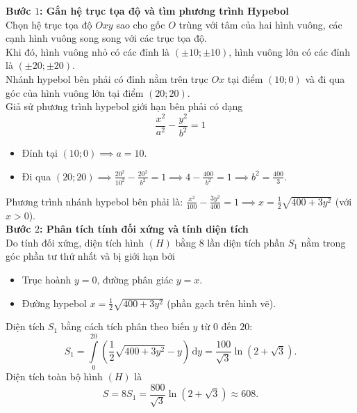 \begin{ex}
{\begin{center}
		\end{center}
		\textbf{Bước $1$: Gắn hệ trục tọa độ và tìm phương trình Hypebol}\\
		Chọn hệ trục tọa độ $Oxy$ sao cho gốc $O$ trùng với tâm của hai hình vuông, các cạnh hình vuông song song với các trục tọa độ.\\
		Khi đó, hình vuông nhỏ có các đỉnh là $(\pm 10; \pm 10)$, hình vuông lớn có các đỉnh là $(\pm 20; \pm 20)$.\\
		Nhánh hypebol bên phải có đỉnh nằm trên trục $Ox$ tại điểm $(10; 0)$ và đi qua góc của hình vuông lớn tại điểm $(20; 20)$.\\
		Giả sử phương trình hypebol giới hạn bên phải có dạng
		\[ \frac{x^2}{a^2} - \frac{y^2}{b^2} = 1 \]
		\begin{itemize}
			\item Đỉnh tại $(10; 0) \implies a = 10$.
			\item Đi qua $(20; 20) \implies \displaystyle \frac{20^2}{10^2} - \frac{20^2}{b^2} = 1 \implies 4 - \frac{400}{b^2} = 1 \implies b^2 = \frac{400}{3}$.
		\end{itemize}
		Phương trình nhánh hypebol bên phải là: $\displaystyle \frac{x^2}{100} - \frac{3y^2}{400} = 1 \implies x = \frac{1}{2}\sqrt{400 + 3y^2}$ (với $x > 0$).\\
		\textbf{Bước $2$: Phân tích tính đối xứng và tính diện tích}\\
		Do tính đối xứng, diện tích hình $(H)$ bằng $8$ lần diện tích phần $S_1$ nằm trong góc phần tư thứ nhất và bị giới hạn bởi
		\begin{itemize}
			\item Trục hoành $y=0$, đường phân giác $y=x$.
			\item Đường hypebol $x = \displaystyle \frac{1}{2}\sqrt{400 + 3y^2}$ (phần gạch trên hình vẽ).
		\end{itemize}
		Diện tích $S_1$ bằng cách tích phân theo biến $y$ từ $0$ đến $20$:
		\[ S_1 = \int\limits_{0}^{20} \left( \frac{1}{2}\sqrt{400 + 3y^2} - y \right) \mathrm{\,d}y = \dfrac{100}{\sqrt{3}}\ln\left(2+\sqrt{3}\right).\]
		Diện tích toàn bộ hình $(H)$ là
		\[ S = 8 S_1 = \dfrac{800}{\sqrt{3}}\ln\left(2+\sqrt{3}\right) \approx 608.\]
	}
\end{ex}

